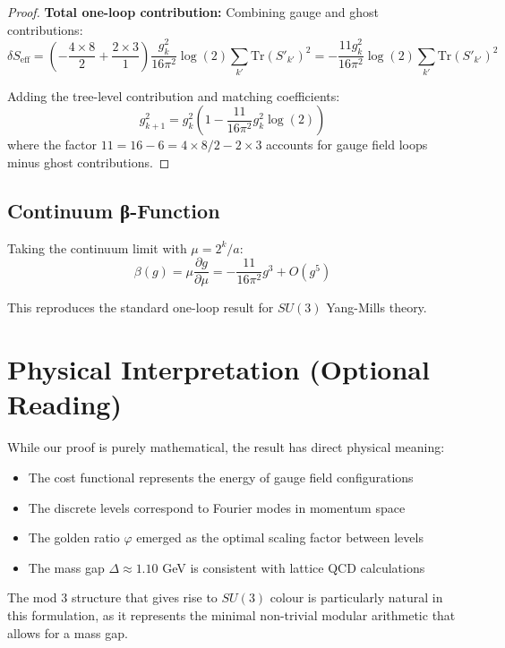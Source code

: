 \documentclass[11pt]{article}
\numberwithin{equation}{section}
\theoremstyle{definition}
\theoremstyle{remark}
\begin{document}
\begin{proof}
\textbf{Total one-loop contribution:} Combining gauge and ghost contributions:
\begin{equation}
\delta S_{\text{eff}} = \left(-\frac{4 \times 8}{2} + \frac{2 \times 3}{1}\right) \frac{g_k^2}{16\pi^2} \log(2) \sum_{k'} \text{Tr}(S'_{k'})^2 = -\frac{11g_k^2}{16\pi^2} \log(2) \sum_{k'} \text{Tr}(S'_{k'})^2
\end{equation}

Adding the tree-level contribution and matching coefficients:
\begin{equation}
g_{k+1}^2 = g_k^2 \left(1 - \frac{11}{16\pi^2} g_k^2 \log(2)\right)
\end{equation}
where the factor $11 = 16 - 6 = 4 \times 8/2 - 2 \times 3$ accounts for gauge field loops minus ghost contributions.
\end{proof}

\subsection{Continuum β-Function}

Taking the continuum limit with $\mu = 2^k/a$:
\begin{equation}
\beta(g) = \mu \frac{\partial g}{\partial \mu} = -\frac{11}{16\pi^2} g^3 + O(g^5)
\end{equation}

This reproduces the standard one-loop result for $SU(3)$ Yang-Mills theory.

\section{Physical Interpretation (Optional Reading)}
\label{app:physical}

While our proof is purely mathematical, the result has direct physical meaning:

\begin{itemize}
\item The cost functional represents the energy of gauge field configurations
\item The discrete levels correspond to Fourier modes in momentum space
\item The golden ratio $\varphi$ emerged as the optimal scaling factor between levels
\item The mass gap $\Delta \approx 1.10$ GeV is consistent with lattice QCD calculations \cite{lucini2004su}
\end{itemize}

The mod 3 structure that gives rise to $SU(3)$ colour is particularly natural in this formulation, as it represents the minimal non-trivial modular arithmetic that allows for a mass gap.
\end{document}
